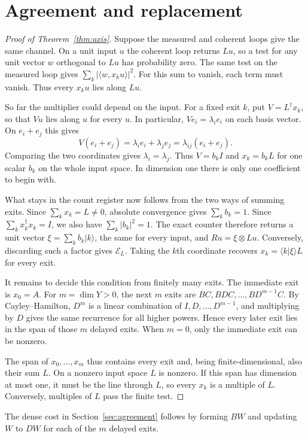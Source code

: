 \documentclass[acmsmall,screen,review,anonymous,nonacm]{acmart}
\newcommand{\ket}[1]{\lvert #1\rangle}
\numberwithin{equation}{section}
\newcommand{\chan}[1]{\mathcal E_{#1}}
\begin{document}
\section{Agreement and replacement}\label{app:axis}
\begin{proof}[Proof of Theorem~\ref{thm:axis}]
\setlength{\parindent}{\appendixindent}
Suppose the measured and coherent loops give the same channel. On a
unit input $u$ the coherent loop returns $Lu$, so a test for any unit
vector $w$ orthogonal to $Lu$ has probability zero. The same test on the
measured loop gives $\sum_k|\langle w,x_ku\rangle|^2$. For this sum to
vanish, each term must vanish. Thus every $x_ku$ lies along $Lu$.

So far the multiplier could depend on the input. For a fixed exit $k$,
put $V=L^\dagger x_k$, so that $Vu$ lies along $u$ for every $u$.
In particular, $Ve_i=\lambda_i e_i$ on each basis vector. On $e_i+e_j$ this gives
\[
 V(e_i+e_j)=\lambda_i e_i+\lambda_j e_j
           =\lambda_{ij}(e_i+e_j).
\]
Comparing the two coordinates gives $\lambda_i=\lambda_j$.
Thus $V=b_k I$ and $x_k=b_kL$ for one scalar $b_k$ on the whole
input space. In dimension one there is only one coefficient to begin with.

What stays in the count register now follows from the two ways of
summing exits. Since $\sum_k x_k=L\ne0$, absolute convergence gives
$\sum_k b_k=1$. Since $\sum_k x_k^\dagger x_k=I$, we also have
$\sum_k|b_k|^2=1$. The exact counter therefore returns a unit vector
$\xi=\sum_k b_k\ket k$, the same for every input, and $Ru=\xi\otimes Lu$.
Conversely, discarding such a factor gives $\chan L$. Taking the $k$th coordinate recovers $x_k=\langle k|\xi\rangle L$ for every exit.

It remains to decide this condition from finitely many exits.
The immediate exit is $x_0=A$. For $m=\dim Y>0$, the next $m$ exits
are $BC,BDC,\ldots,BD^{m-1}C$. By Cayley--Hamilton, $D^m$ is a
linear combination of $I,D,\ldots,D^{m-1}$, and multiplying by $D$
gives the same recurrence for all higher powers. Hence every later
exit lies in the span of those $m$ delayed exits. When $m=0$, only
the immediate exit can be nonzero.

The span of $x_0,\ldots,x_m$ thus contains every exit and, being
finite-dimensional, also their sum $L$. On a nonzero input space
$L$ is nonzero. If this span has dimension at most one, it must be
the line through $L$, so every $x_k$ is a multiple of $L$.
Conversely, multiples of $L$ pass the finite test.
\end{proof}
The dense cost in Section~\ref{sec:agreement} follows by forming $BW$ and updating $W$ to $DW$ for each of the $m$ delayed exits.
\end{document}
